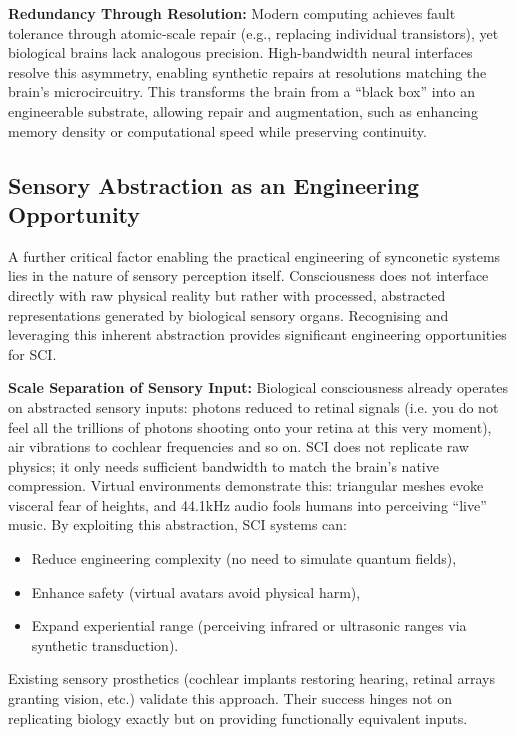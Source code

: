 \documentclass[10pt]{article}
\begin{document}
\begin{sloppypar}
  \textbf{Redundancy Through Resolution:} Modern computing achieves fault tolerance through atomic-scale repair (e.g., replacing individual transistors), yet biological brains lack analogous precision. High-bandwidth neural interfaces resolve this asymmetry, enabling synthetic repairs at resolutions matching the brain’s microcircuitry. This transforms the brain from a “black box” into an engineerable substrate, allowing repair and augmentation, such as enhancing memory density or computational speed while preserving continuity.

  \subsection{Sensory Abstraction as an Engineering Opportunity}
  \label{sec:sensory-abstraction}

  A further critical factor enabling the practical engineering of synconetic systems lies in the nature of sensory perception itself. Consciousness does not interface directly with raw physical reality but rather with processed, abstracted representations generated by biological sensory organs. Recognising and leveraging this inherent abstraction provides significant engineering opportunities for SCI.

  \textbf{Scale Separation of Sensory Input:} Biological consciousness already operates on abstracted sensory inputs: photons reduced to retinal signals (i.e. you do not feel all the trillions of photons shooting onto your retina at this very moment), air vibrations to cochlear frequencies and so on. SCI does not replicate raw physics; it only needs sufficient bandwidth to match the brain’s native compression. Virtual environments demonstrate this: triangular meshes evoke visceral fear of heights, and 44.1kHz audio fools humans into perceiving “live” music. By exploiting this abstraction, SCI systems can:

  \begin{itemize}
    \item Reduce engineering complexity (no need to simulate quantum fields),
    \item Enhance safety (virtual avatars avoid physical harm),
    \item Expand experiential range (perceiving infrared or ultrasonic ranges via synthetic transduction).
  \end{itemize}

  Existing sensory prosthetics (cochlear implants restoring hearing, retinal arrays granting vision, etc.) validate this approach. Their success hinges not on replicating biology exactly but on providing functionally equivalent inputs.


\end{sloppypar}
\end{document}
